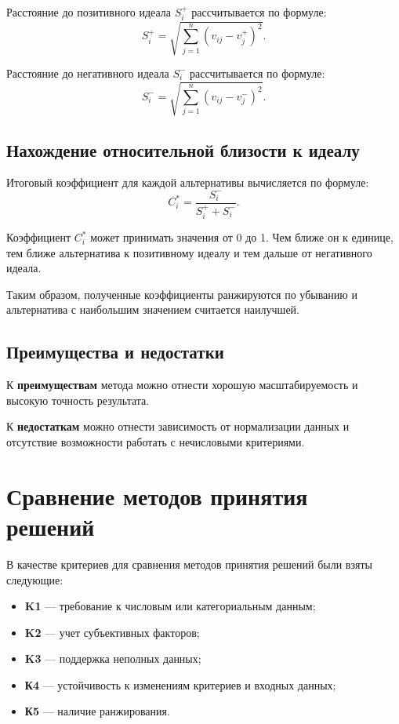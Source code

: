 Расстояние до позитивного идеала $S_i^+$ рассчитывается по формуле:
\begin{equation}
	S_i^+ = \sqrt{\sum_{j=1}^n (v_{ij} - v_j^+)^2}.
	\label{eq:TOPSIS_SI-}
\end{equation}


Расстояние до негативного идеала $S_i^-$ рассчитывается по формуле:
\begin{equation}
	S_i^- = \sqrt{\sum_{j=1}^n (v_{ij} - v_j^-)^2}.
	\label{eq:TOPSIS_SI+}
\end{equation}

\subsection*{Нахождение относительной близости к идеалу} 

Итоговый коэффициент для каждой альтернативы вычисляется по формуле:
\begin{equation}
	C_i^* = \frac{S_i^-}{S_i^+ + S_i^-}.
	\label{eq:TOPSIS_C}
\end{equation}

Коэффициент $C_i^*$ может принимать значения от 0 до 1.
Чем ближе он к единице, тем ближе альтернатива к позитивному идеалу и тем дальше от негативного идеала.

Таким образом, полученные коэффициенты ранжируются по убыванию и альтернатива с наибольшим значением считается наилучшей.

\subsection*{Преимущества и недостатки}

К \textbf{преимуществам} метода можно отнести хорошую масштабируемость и высокую точность результата.

К \textbf{недостаткам} можно отнести зависимость от нормализации данных и отсутствие возможности работать с нечисловыми критериями.

\section{Сравнение методов принятия решений}
В качестве критериев для сравнения методов принятия решений были взяты следующие:
\begin{itemize}
	\item \textbf{K1} --- требование к числовым или категориальным данным;
	
	\item \textbf{K2} --- учет субъективных факторов;
	
	\item \textbf{K3} --- поддержка неполных данных;
	
	\item  \textbf{К4} --- устойчивость к изменениям критериев и входных данных;
	
	\item  \textbf{К5} --- наличие ранжирования.
	
\end{itemize}

